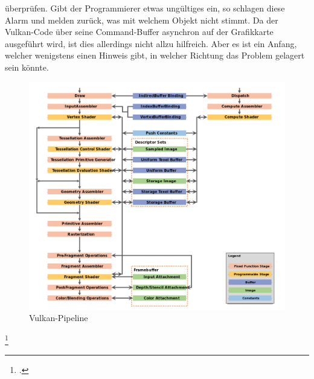 \documentclass[titlepage, 11pt, a4paper, ngerman]{article}
\begin{document}
überprüfen. Gibt der Programmierer etwas ungültiges ein, so schlagen diese Alarm und melden zurück, was mit welchem Objekt nicht stimmt. Da der Vulkan-Code über seine Command-Buffer asynchron auf der Grafikkarte ausgeführt wird, ist dies allerdings nicht allzu hilfreich. Aber es ist ein Anfang, welcher wenigstens einen Hinweis gibt, in welcher Richtung das Problem gelagert sein könnte.
\begin{figure}[ht]
    \centering
    \includegraphics[scale=0.5]{res/vkpipeline1.png}
    \caption[Vulkan-Pipeline]{Vulkan-Pipeline\footnotemark}
    \label{fig:vk-pipe}
\end{figure}
\footcitetext{vk-pipeline-vkspec}
\end{document}
